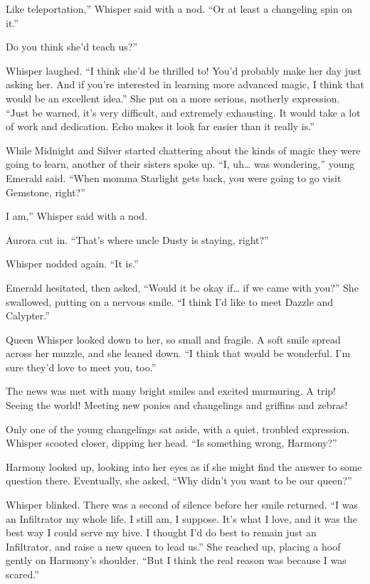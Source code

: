 \leavevmode{}Like teleportation,” Whisper said with a nod. “Or at least a changeling spin on it.”

\leavevmode{}Do you think she’d teach us?”

Whisper laughed. “I think she’d be thrilled to! You’d probably make her day just asking her. And if you’re interested in learning more advanced magic, I think that would be an excellent idea.” She put on a more serious, motherly expression. “Just be warned, it’s very difficult, and extremely exhausting. It would take a lot of work and dedication. Echo makes it look far easier than it really is.”

While Midnight and Silver started chattering about the kinds of magic they were going to learn, another of their sisters spoke up. “I, uh… was wondering,” young Emerald said. “When momma Starlight gets back, you were going to go visit Gemstone, right?”

\leavevmode{}I am,” Whisper said with a nod.

Aurora cut in. “That’s where uncle Dusty is staying, right?”

Whisper nodded again. “It is.”

Emerald hesitated, then asked, “Would it be okay if… if we came with you?” She swallowed, putting on a nervous smile. “I think I’d like to meet Dazzle and Calypter.”

Queen Whisper looked down to her, so small and fragile. A soft smile spread across her muzzle, and she leaned down. “I think that would be wonderful. I’m sure they’d love to meet you, too.”

The news was met with many bright smiles and excited murmuring. A trip! Seeing the world! Meeting new ponies and changelings and griffins and zebras!

Only one of the young changelings sat aside, with a quiet, troubled expression. Whisper scooted closer, dipping her head. “Is something wrong, Harmony?”

Harmony looked up, looking into her eyes as if she might find the answer to some question there. Eventually, she asked, “Why didn’t you want to be our queen?”

Whisper blinked. There was a second of silence before her smile returned. “I was an Infiltrator my whole life. I still am, I suppose. It’s what I love, and it was the best way I could serve my hive. I thought I’d do best to remain just an Infiltrator, and raise a new queen to lead us.” She reached up, placing a hoof gently on Harmony’s shoulder. “But I think the real reason was because I was scared.”

